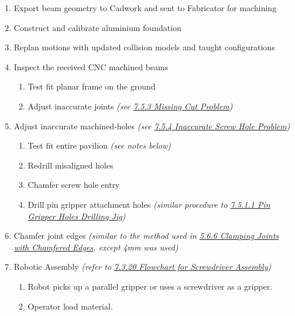 \documentclass[11pt]{book}
\begin{document}
\begin{enumerate}
	\item Export beam geometry to Cadwork and sent to Fabricator for machining

	\item Construct and calibrate aluminium foundation 

	\item Replan motions with updated collision models and taught configurations

	\item Inspect the received CNC machined beams

\begin{enumerate}
	\item Test fit planar frame on the ground

	\item Adjust inaccurate joints  \textit{(see \uline{7.5.3 Missing Cut Problem})}

\end{enumerate}
	\item Adjust inaccurate machined-holes \textit{(see \uline{7.5.4 Inaccurate Screw Hole Problem})}

\begin{enumerate}
	\item Test fit entire pavilion\textit{ (see notes below)}

	\item Redrill misaligned holes

	\item Chamfer screw hole entry

	\item Drill pin gripper attachment holes \textit{(similar procedure to \uline{7.5.1.1 Pin Gripper Holes Drilling Jig})}

\end{enumerate}
	\item Chamfer joint edges \textit{(similar to the method used in \uline{5.6.6 Clamping Joints with Chamfered Edges}, except 4mm was used)}

	\item Robotic Assembly\textit{ (refer to \uline{7.3.20 Flowchart for Screwdriver Assembly})}

\begin{enumerate}
	\item Robot picks up a parallel gripper or uses a screwdriver as a gripper.

	\item Operator load material.


\end{enumerate}
\end{enumerate}
\end{document}
